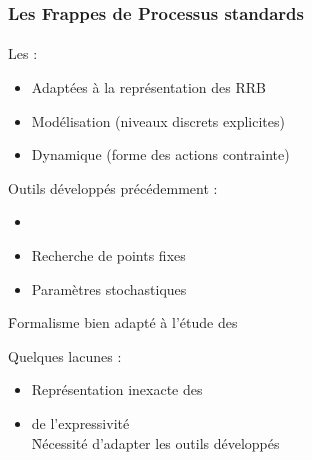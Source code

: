 
\begin{frame}[c]
  \frametitle{Les Frappes de Processus standards}
  \framesubtitle{\tcite{\cpmrtcsb}}

Les  :
\begin{itemize}
  \item Adaptées à la représentation des RRB
  \item Modélisation  (niveaux discrets explicites)
  \item Dynamique  (forme des actions contrainte)
\end{itemize}

\pause
\bigskip
Outils développés précédemment :
\begin{itemize}
  \item {}
  \item Recherche de points fixes
  \item Paramètres stochastiques
\end{itemize}

\medskip
\f Formalisme bien adapté à l'étude des 

\pause
\bigskip
Quelques lacunes :
\begin{itemize}
  \item Représentation inexacte des 
  \item {} de l'expressivité\\
    \quad \f Nécessité d'adapter les outils développés
\end{itemize}

\end{frame}



